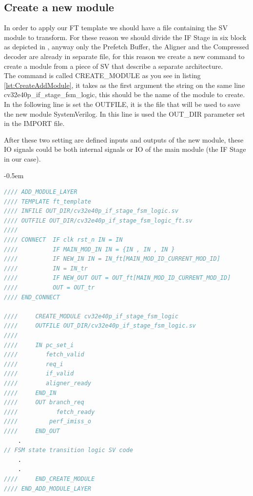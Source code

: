{{        \subsection{Create a new module}{
            \label{CreateNewModule}
            
            In order to apply our FT template we should have a file containing the SV module to transform. 
            For these reason we should divide the IF Stage in six block as  depicted in , anyway only the Prefetch Buffer, the Aligner and the Compressed decoder are already in separate file, for this reason we create a new command to create a module from a piece of SV that describe a separate architecture.\\
            
            The command is called CREATE\_MODULE as you see in listing \ref{lst:CreateAddModule}, it takes as the first argument the string on the same line  cv32e40p\_if\_stage\_fsm\_logic, this should be the name of the module to create. 
            In the following line is set the OUTFILE, it is the file that will be used to save the new module SystemVerilog.
            In this line is used the OUT\_DIR parameter set in the IMPORT file.
            
            After these two setting are defined inputs and outputs of the new module, these IO signals could be both internal signals or IO of the main module (the IF Stage in our case).
            
            
            
    		\openup -0.5em

    			\begin{lstlisting}[basicstyle=\ttfamily\scriptsize, language=Verilog, caption=HTV code to create a new block and transform it using TV template, label=lst:CreateAddModule]
//// ADD_MODULE_LAYER 
//// TEMPLATE ft_template 
//// INFILE OUT_DIR/cv32e40p_if_stage_fsm_logic.sv
//// OUTFILE OUT_DIR/cv32e40p_if_stage_fsm_logic_ft.sv
////
//// CONNECT  IF clk rst_n IN = IN
////	      IF MAIN_MOD_IN IN = {IN , IN , IN }
////          IF NEW_IN IN = IN_ft[MAIN_MOD_ID_CURRENT_MOD_ID] 
////	      IN = IN_tr
////	      IF NEW_OUT OUT = OUT_ft[MAIN_MOD_ID_CURRENT_MOD_ID]
//// 	      OUT = OUT_tr	
//// END_CONNECT

////	 CREATE_MODULE cv32e40p_if_stage_fsm_logic
////	 OUTFILE OUT_DIR/cv32e40p_if_stage_fsm_logic.sv
////	
////	 IN pc_set_i
////	    fetch_valid
////	    req_i
////	    if_valid
////	    aligner_ready
////	 END_IN
////	 OUT branch_req
////	 	   fetch_ready
////	     perf_imiss_o
////	 END_OUT
    .
// FSM state transition logic SV code
    .
    .
////	 END_CREATE_MODULE
//// END_ADD_MODULE_LAYER
        		\end{lstlisting}
    		
}}}
